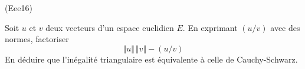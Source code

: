 \begin{tiny}(Eee16)\end{tiny} Soit $u$ et $v$ deux vecteurs d'un espace euclidien $E$. En exprimant $(u/v)$ avec des normes, factoriser
\begin{displaymath}
 \Vert u \Vert\, \Vert v \Vert -(u/v)  
\end{displaymath}
En déduire que l'inégalité triangulaire est équivalente à celle de Cauchy-Schwarz.
